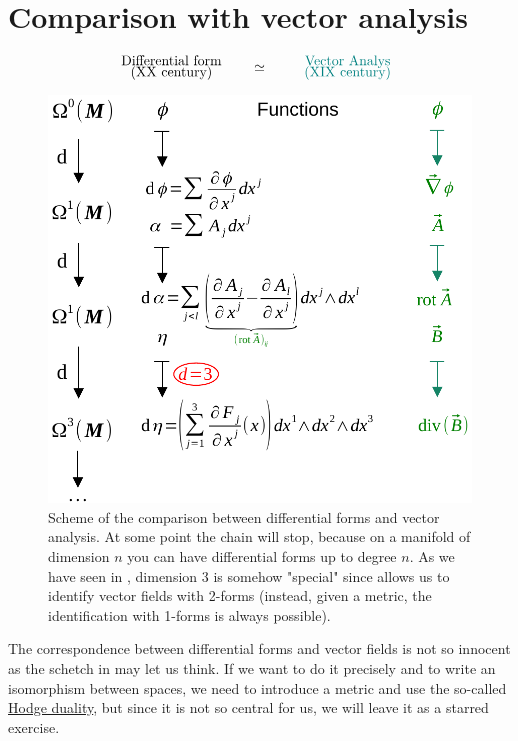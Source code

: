 \documentclass[../main.tex]{subfiles}
\begin{document}
\section{Comparison with vector analysis}
\[
\text{\parbox{4 cm}{\centering Differential form \\[-4pt]  {(XX century)}}}\simeq\text{\parbox{4 cm}{\color{teal} \centering Vector Analys \\[-4pt]  (XIX century)}}
\]
\begin{figure}[H]
	\includegraphics{images/schema_confronto_diff_analisi.pdf}
	\caption[Scheme of the comparison between differential forms and vector analysis]{Scheme of the comparison between differential forms and vector analysis. At some point the chain will stop, because on a manifold of dimension $n$ you can have differential forms up to degree $n$. As we have seen in , dimension $3$ is somehow "special" since allows us to identify vector fields with 2-forms (instead, given a metric, the identification with 1-forms is always possible).}
\end{figure}
The correspondence between differential forms and vector fields is not so innocent as the schetch in  may let us think. If we want to do it precisely and to write an isomorphism between spaces, we need to introduce a metric and use the so-called \href{https://en.wikipedia.org/wiki/Hodge_star_operator}{Hodge duality}, but since it is not so central for us, we will leave it as a starred exercise.\\
\end{document}
